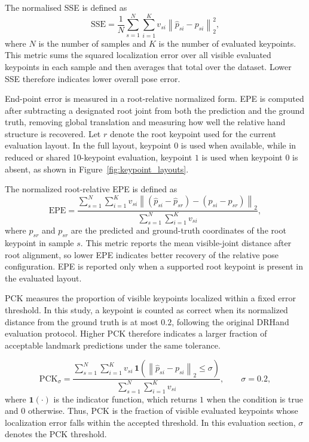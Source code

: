 ﻿\documentclass[10pt,letterpaper]{article}
\begin{document}
The normalised SSE is defined as
\begin{equation}
\mathrm{SSE} =
\frac{1}{N}
\sum_{s=1}^{N}
\sum_{i=1}^{K}
v_{si}\left\|
\hat{p}_{si} - p_{si}
\right\|_2^2,
\label{eq:sse}
\end{equation}
where \(N\) is the number of samples and \(K\) is the number of evaluated keypoints. This metric sums the squared localization error over all visible evaluated keypoints in each sample and then averages that total over the dataset. Lower SSE therefore indicates lower overall pose error.

\medskip
\noindent
End-point error is measured in a root-relative normalized form. EPE is computed after subtracting a designated root joint from both the prediction and the ground truth, removing global translation and measuring how well the relative hand structure is recovered. Let \(r\) denote the root keypoint used for the current evaluation layout. In the full layout, keypoint \(0\) is used when available, while in reduced or shared 10-keypoint evaluation, keypoint \(1\) is used when keypoint \(0\) is absent, as shown in Figure~\ref{fig:keypoint_layouts}.

The normalized root-relative EPE is defined as
\begin{equation}
\mathrm{EPE} =
\frac{
\sum_{s=1}^{N}
\sum_{i=1}^{K}
v_{si}
\left\|
(\hat{p}_{si} - \hat{p}_{sr}) - (p_{si} - p_{sr})
\right\|_2
}{
\sum_{s=1}^{N}
\sum_{i=1}^{K}
v_{si}
},
\label{eq:epe}
\end{equation}
where \(\hat{p}_{sr}\) and \(p_{sr}\) are the predicted and ground-truth coordinates of the root keypoint in sample \(s\). This metric reports the mean visible-joint distance after root alignment, so lower EPE indicates better recovery of the relative pose configuration. EPE is reported only when a supported root keypoint is present in the evaluated layout.

\medskip
\noindent
PCK measures the proportion of visible keypoints localized within a fixed error threshold. In this study, a keypoint is counted as correct when its normalized distance from the ground truth is at most \(0.2\), following the original DRHand evaluation protocol. Higher PCK therefore indicates a larger fraction of acceptable landmark predictions under the same tolerance.

\begin{equation}
\mathrm{PCK}_{\sigma} =
\frac{
\sum_{s=1}^{N}
\sum_{i=1}^{K}
v_{si}\,\mathbf{1}
\left(
\left\|
\hat{p}_{si} - p_{si}
\right\|_2 \le \sigma
\right)
}{
\sum_{s=1}^{N}
\sum_{i=1}^{K}
v_{si}
},
\qquad \sigma = 0.2,
\label{eq:pck}
\end{equation}
where \(\mathbf{1}(\cdot)\) is the indicator function, which returns \(1\) when the condition is true and \(0\) otherwise. Thus, PCK is the fraction of visible evaluated keypoints whose localization error falls within the accepted threshold. In this evaluation section, \(\sigma\) denotes the PCK threshold.
\end{document}
